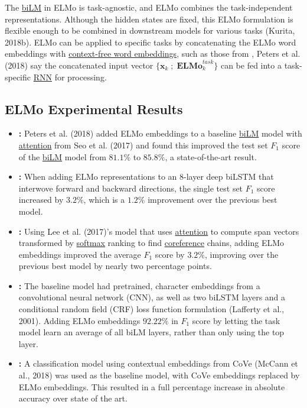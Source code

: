 The \hyperref[sec:BidirectionalLM]{biLM} in ELMo is task-agnostic, and ELMo combines the task-independent representations. Although the hidden states are fixed, this ELMo formulation is flexible enough to be combined in downstream models for various tasks (Kurita, 2018b). ELMo can be applied to specific tasks by concatenating the ELMo word embeddings with \hyperref[sec:StaticVsContextualEmb]{context-free word embeddings}, such as those from , Peters et al. (2018) say the concatenated input vector $\Big\{ \mathbf{x}_k \; ; \; \textbf{ELMo}_k^{task} \Big\}$ can be fed into a task-specific \hyperref[sec:RNN]{RNN} for processing. 

\subsection{ELMo Experimental Results} \label{sec:ResultsELMo}

\begin{itemize}
    \item  \textbf{: } Peters et al. (2018) added ELMo embeddings to a baseline \hyperref[sec:BidirectionalLM]{biLM} model with \hyperref[sec:AttentionMechanism]{attention} from Seo et al. (2017) and found this improved the test set $F_1$ score of the \hyperref[sec:BidirectionalLM]{biLM} model from $81.1 \%$ to $85.8 \%$, a state-of-the-art result. 

    \item \textbf{: } When adding ELMo representations to an 8-layer deep biLSTM that interwove forward and backward directions, the single test set $F_1$ score increased by $3.2 \%$, which is a $1.2 \%$ improvement over the previous best model. 
    
    \item \textbf{: } Using Lee et al. (2017)'s model that uses \hyperref[sec:AttentionMechanism]{attention} to compute span vectors transformed by \hyperref[cnc:softmaxLayer]{softmax} ranking to find \hyperref[nlptask:coreferenceresolutionCR]{coreference} chains, adding ELMo embeddings improved the average $F_1$ score by $3.2 \%$, improving over the previous best model by nearly two percentage points. 
    
    \item \textbf{: } The baseline model had pretrained, character embeddings from a convolutional neural network (CNN), as well as two biLSTM layers and a conditional random field (CRF) loss function formulation (Lafferty et al., 2001). Adding ELMo embeddings $92.22 \%$ in $F_1$ score by letting the task model learn an average of all biLM layers, rather than only using the top layer. 
    
    \item \textbf{: } A classification model using contextual embeddings from CoVe (McCann et al., 2018) was used as the baseline model, with CoVe embeddings replaced by ELMo embeddings. This resulted in a full percentage increase in absolute accuracy over state of the art. 
\end{itemize}



